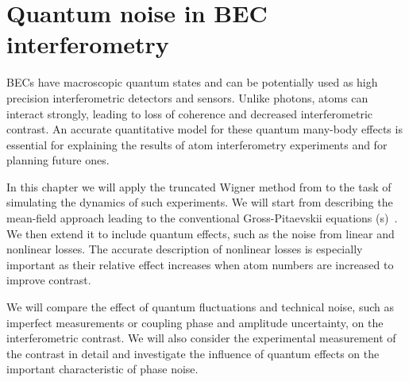 \chapter{Quantum noise in BEC interferometry}
\label{cha:bec-noise}

BECs have macroscopic quantum states and can be potentially used as high precision interferometric detectors and sensors.
Unlike photons, atoms can interact strongly, leading to loss of coherence and decreased interferometric contrast.
An accurate quantitative model for these quantum many-body effects is essential for explaining the results of atom interferometry experiments and for planning future ones.

In this chapter we will apply the truncated Wigner method from  to the task of simulating the dynamics of such experiments.
We will start from describing the mean-field approach leading to the conventional Gross-Pitaevskii equations (s)~\cite{Pitaevskii2003}.
We then extend it to include quantum effects, such as the noise from linear and nonlinear losses.
The accurate description of nonlinear losses is especially important as their relative effect increases when atom numbers are increased to improve contrast.

We will compare the effect of quantum fluctuations and technical noise, such as imperfect measurements or coupling phase and amplitude uncertainty, on the interferometric contrast.
We will also consider the experimental measurement of the contrast in detail and investigate the influence of quantum effects on the important characteristic of phase noise.








